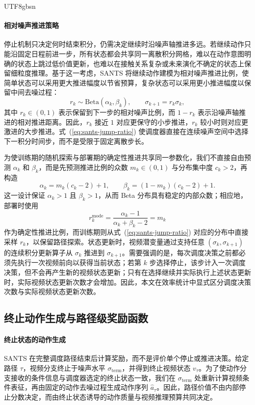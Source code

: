 \documentclass{article}
\begin{document}
\begin{CJK*}{UTF8}{gbsn}
\paragraph{相对噪声推进策略}
停止机制只决定何时结束积分，仍需决定继续时沿噪声轴推进多远。若继续动作只能沿固定日程前进一步，所有状态都会共享同一离散积分网格，难以在动作意图明确的状态上跳过低价值更新，也难以在接触关系复杂或未来演化不确定的状态上保留细粒度推理。基于这一考虑，SANTS 将继续动作建模为相对噪声推进比例，使简单状态可以采用更大推进幅度以节省预算，复杂状态可以采用更小推进幅度以保留中间去噪过程：
\begin{equation}
r_k \sim \mathrm{Beta}(\alpha_k,\beta_k), \qquad \sigma_{k+1}=r_k\sigma_k,
\label{eq:sants-jump-ratio}
\end{equation}
其中 \(r_k\in(0,1)\) 表示保留到下一步的相对噪声比例，而 \(1-r_k\) 表示沿噪声轴推进的相对推进距离。因此，\(r_k\) 接近 \(1\) 对应更保守的小步推进，\(r_k\) 较小时则对应更激进的大步推进。式~(\ref{eq:sants-jump-ratio}) 使调度器直接在连续噪声空间中选择下一积分时间步，而不是受限于固定离散步长。

为使训练期的随机探索与部署期的确定性推进共享同一参数化，我们不直接自由预测 \(\alpha_k\) 和 \(\beta_k\)，而是先预测推进比例的众数 \(m_k\in(0,1)\) 与分布集中度 \(c_k>2\)，再构造
\begin{equation}
\alpha_k = m_k(c_k-2)+1,\qquad \beta_k=(1-m_k)(c_k-2)+1.
\label{eq:sants-jump-param}
\end{equation}
这一设计保证 \(\alpha_k>1\) 且 \(\beta_k>1\)，从而 Beta 分布具有稳定的内部众数；相应地，部署时使用
\begin{equation}
r_k^{\mathrm{mode}}=\frac{\alpha_k-1}{\alpha_k+\beta_k-2}=m_k
\label{eq:sants-jump-mode}
\end{equation}
作为确定性推进比例，而训练期则从式~(\ref{eq:sants-jump-ratio}) 对应的分布中直接采样 \(r_k\)，以保留路径探索。状态更新时，视频潜变量通过支持任意 \((\sigma_k,\sigma_{k+1})\) 的连续积分更新算子从 \(\sigma_k\) 推进到 \(\sigma_{k+1}\)。需要强调的是，每次调度决策之前都必须先执行一次视频前向以获得当前状态；若第 \(k\) 步选择停止，该步计入一次调度决策，但不会再产生新的视频状态更新；只有在选择继续并实际执行上述状态更新时，实际视频状态更新次数才会增加。因此，本文在效率统计中显式区分调度决策次数与实际视频状态更新次数。

\subsection{终止动作生成与路径级奖励函数}

\paragraph{终止状态的动作生成}
SANTS 在完整调度路径结束后计算奖励，而不是评价单个停止或推进决策。给定路径 \(\tau\)，视频分支终止于噪声水平 \(\sigma_{\mathrm{term}}\)，并得到终止视频状态 \(v_{\tau}\)。为了使动作分支接收的条件信息与调度器选定的终止状态一致，我们在 \(\sigma_{\mathrm{term}}\) 处重新计算视频条件表征，再由固定的动作去噪过程生成动作序列 \(\hat{a}_{\tau}\)。因此，路径价值不由内部停止分数决定，而由终止状态诱导的动作质量与视频推理预算共同决定。


\end{CJK*}
\end{document}
